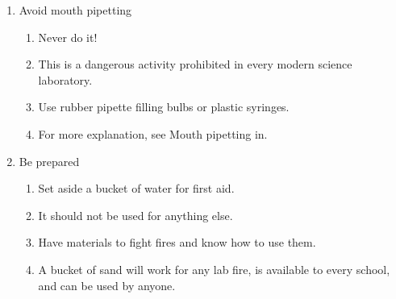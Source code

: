\begin{enumerate}
\item{Avoid mouth pipetting}
\begin{enumerate}
\item{Never do it!}
\item{This is a dangerous activity 
prohibited in every modern science laboratory.}
\item{Use rubber pipette filling bulbs or plastic syringes.}
\item{For more explanation, see Mouth pipetting in.}
\end{enumerate}

\item{Be prepared}
\begin{enumerate}
\item{Set aside a bucket of water for first aid.}
\item{It should not be used for anything else.}
\item{Have materials to fight fires and know how to use them.}
\item{A bucket of sand will work for any lab fire, 
is available to every school, and can be used by anyone.}
\end{enumerate}


\end{enumerate}
